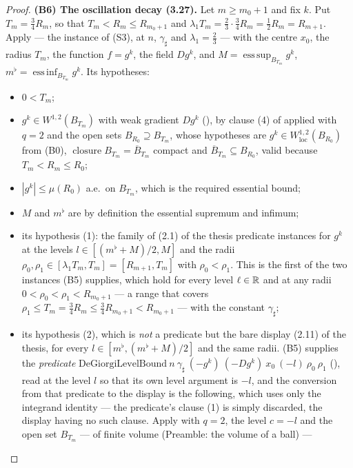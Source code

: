\begin{proof}
\textbf{(B6) The oscillation decay \textup{(3.27)}.}  Let $m\ge m_0+1$ and fix
$k$.  Put $T_m=\tfrac34R_m$, so that $T_m<R_m\le R_{m_0+1}$ and
$\lambda_1T_m=\tfrac23\cdot\tfrac34R_m=\tfrac12R_m=R_{m+1}$.  Apply
 --- the instance of (S3), at $n$,
$\gamma_\sharp$ and $\lambda_1=\tfrac23$ --- with the centre $x_0$, the radius
$T_m$, the function $f=g^k$, the field $Dg^k$, and
$M=\operatorname{ess\,sup}_{B_{T_m}}g^k$,
$m^\flat=\operatorname{ess\,inf}_{B_{T_m}}g^k$.  Its hypotheses:
\begin{itemize}
\item $0<T_m$;
\item $g^k\in W^{1,2}(B_{T_m})$ with weak gradient $Dg^k$
  (), by clause (4) of  applied
  with $q=2$ and the open sets $B_{R_0}\supseteq B_{T_m}$, whose hypotheses are
  $g^k\in W^{1,2}_{\mathrm{loc}}(B_{R_0})$ from (B0),
  $\operatorname{closure}B_{T_m}=\overline B_{T_m}$ compact and
  $\overline B_{T_m}\subseteq B_{R_0}$, valid because $T_m<R_m\le R_0$;
\item $|g^k|\le\mu(R_0)$ a.e.\ on $B_{T_m}$, which is the required essential
  bound;
\item $M$ and $m^\flat$ are by definition the essential supremum and infimum;
\item its hypothesis (1): the family of (2.1) of the thesis predicate instances for
  $g^k$ at the levels $l\in[(m^\flat+M)/2,M]$ and the radii
  $\rho_0,\rho_1\in[\lambda_1T_m,T_m]=[R_{m+1},T_m]$ with $\rho_0<\rho_1$.  This
  is the first of the two instances (B5) supplies, which hold for every level
  $\ell\in\mathbb{R}$ and at any radii $0<\rho_0<\rho_1<R_{m_0+1}$ --- a range that
  covers $\rho_1\le T_m=\tfrac34R_m\le\tfrac34R_{m_0+1}<R_{m_0+1}$ --- with the
  constant $\gamma_\sharp$;
\item its hypothesis (2), which is \emph{not} a predicate but the bare display
  (2.11) of the thesis, for every $l\in[m^\flat,(m^\flat+M)/2]$ and the same radii.
  (B5) supplies the \emph{predicate}
  $\mathrm{DeGiorgiLevelBound}\ n\ \gamma_\sharp\ (-g^k)\ (-Dg^k)\ x_0\ (-l)\
  \rho_0\ \rho_1$ (), read at the level $l$ so that
  its own level argument is $-l$, and the conversion from that predicate to the
  display is the following, which uses only the integrand identity --- the
  predicate's clause (1) is simply discarded, the display having no such clause.
  Apply \noderef{WeakGradientPositivePart} with $q=2$, the level $c=-l$ and the
  open set $B_{T_m}$ --- of finite volume (Preamble: the volume of a ball) ---

\end{itemize}
\end{proof}
